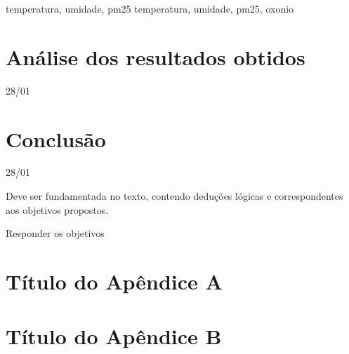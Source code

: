 \documentclass[
  12pt,		%
  a4paper,	%
  openright,%
  oneside,	%
  chapter=TITLE,		%
  section=TITLE,		%
  english,	%
  french,	%
  spanish,	%
  brazil	%
]{abntex2}
\begin{document}
    temperatura, umidade, pm25
    temperatura, umidade, pm25, oxonio
    \chapter{Análise dos resultados obtidos}
    28/01

    \chapter{Conclusão}
    28/01
    
        Deve ser fundamentada no texto, contendo deduções lógicas e correspondentes aos objetivos propostos.
        
        Responder os objetivos
    
    \postextual
    
    
    
    
    
    \begin{apendicesenv}
        
        \chapter{Título do Apêndice A}
            \lipsum[50]
        
        \chapter{Título do Apêndice B}
            \lipsum[51]
        
    \end{apendicesenv}
    
\end{document}
